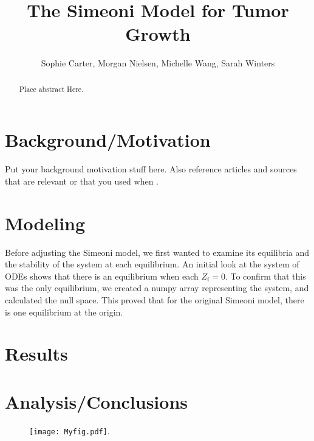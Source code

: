 \documentclass[11pt]{amsart}
\begin{document}
\title{The Simeoni Model for Tumor Growth}
\author{Sophie Carter, Morgan Nielsen, Michelle Wang, Sarah Winters}

\date{}

\maketitle

\begin{abstract}
Place abstract Here.
\end{abstract}

\section{Background/Motivation}

Put your background motivation stuff here. Also reference articles and sources that are relevant or that you used when  \cite{Vandermeersch}. 

\section{Modeling}
Before adjusting the Simeoni model, we first wanted to examine its equilibria and the stability of the system at each equilibrium. An initial look at the system of ODEs shows that there is an equilibrium when each $Z_i = 0$. To confirm that this was the only equilibrium, we created a numpy array representing the system, and calculated the null space. This proved that for the original Simeoni model, there is one equilibrium at the origin. 


\section{Results}

\section{Analysis/Conclusions}


\begin{figure}[h]
\begin{center} %
\texttt{[image: Myfig.pdf]}. %
\end{center}
\label{fig:MatrixError}
\end{figure}
\end{document}
